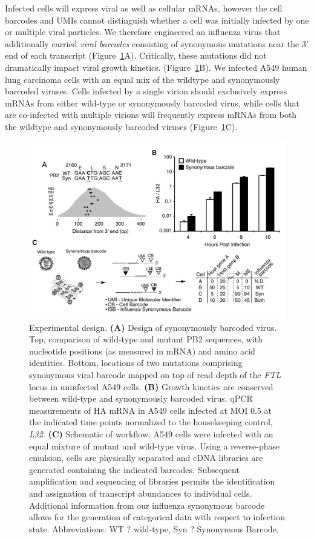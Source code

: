 \documentclass[9pt,lineno]{elife}
\begin{document}
Infected cells will express viral as well as cellular mRNAs, however the cell barcodes and UMIs cannot distinguish whether a cell was initially infected by one or multiple viral particles.
We therefore engineered an influenza virus that additionally carried \emph{viral barcodes} consisting of synonymous mutations near the 3' end of each transcript (Figure~\ref{fig:workflow}A).
Critically, these mutations did not dramatically impact viral growth kinetics. (Figure~\ref{fig:workflow}B).
We infected A549 human lung carcinoma cells with an equal mix of the wildtype and synonymously barcoded viruses.
Cells infected by a single virion should exclusively express mRNAs from either wild-type or synonymously barcoded virus, while cells that are co-infected with multiple virions will frequently express mRNAs from both the wildtype and synonymously barcoded viruses (Figure~\ref{fig:workflow}C).
\begin{figure}
\includegraphics[width=0.8\linewidth]{figures/Workflow/workflow.pdf}
\caption{\label{fig:workflow} Experimental design.
{\bf (A)}  Design of synonymously barcoded virus. Top, comparison of wild-type and mutant PB2 sequences, with nucleotide positions (as measured in mRNA) and amino acid identities. Bottom, locations of two mutations comprising synonymous viral barcode mapped on top of read depth of the \emph{FTL} locus in uninfected A549 cells.
{\bf (B)} Growth kinetics are conserved between wild-type and synonymously barcoded virus. qPCR measurements of HA mRNA in A549 cells infected at MOI 0.5 at the indicated time points normalized to the housekeeping control, \emph{L32}.
{\bf (C)}  Schematic of workflow. A549 cells were infected with an equal mixture of mutant and wild-type virus. Using a reverse-phase emulsion, cells are physically separated and cDNA libraries are generated containing the indicated barcodes. Subsequent amplification and sequencing of libraries permits the identification and assignation of transcript abundances to individual cells. Additional information from our influenza synonymous barcode allows for the generation of categorical data with respect to infection state. Abbreviations: WT ? wild-type, Syn ? Synonymous Barcode.
}
\end{figure}
\end{document}
